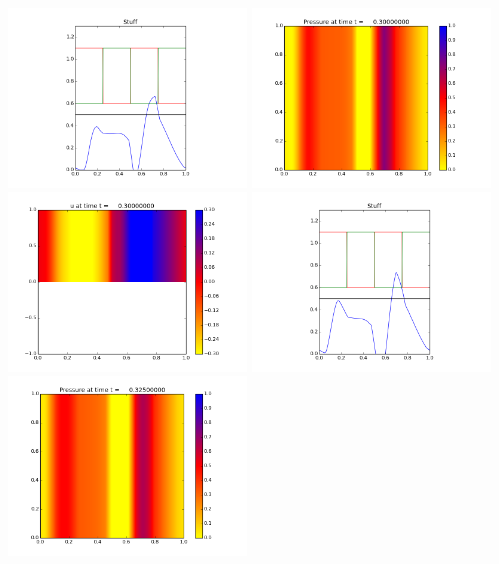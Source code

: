 \documentclass[11pt]{article}
\begin{document}
\vskip 10pt 
\includegraphics[width=0.475\textwidth]{frame0011fig3.png}
\vskip 10pt 
\includegraphics[width=0.475\textwidth]{frame0012fig0.png}
\includegraphics[width=0.475\textwidth]{frame0012fig1.png}
\vskip 10pt 
\includegraphics[width=0.475\textwidth]{frame0012fig3.png}
\vskip 10pt 
\includegraphics[width=0.475\textwidth]{frame0013fig0.png}
\end{document}
